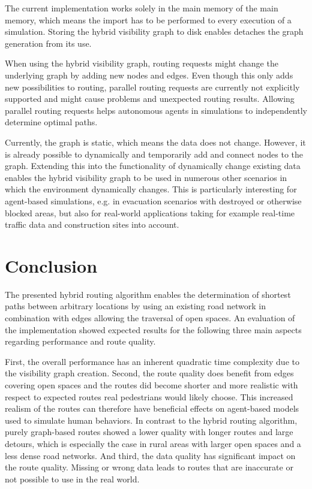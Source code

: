 		The current implementation works solely in the main memory of the main memory, which means the import has to be performed to every execution of a simulation.
		Storing the hybrid visibility graph to disk enables detaches the graph generation from its use.
		
		When using the hybrid visibility graph, routing requests might change the underlying graph by adding new nodes and edges.
		Even though this only adds new possibilities to routing, parallel routing requests are currently not explicitly supported and might cause problems and unexpected routing results.
		Allowing parallel routing requests helps autonomous agents in simulations to independently determine optimal paths.
		
		Currently, the graph is static, which means the data does not change.
		However, it is already possible to dynamically and temporarily add and connect nodes to the graph.
		Extending this into the functionality of dynamically change existing data enables the hybrid visibility graph to be used in numerous other scenarios in which the environment dynamically changes.
		This is particularly interesting for agent-based simulations, e.g. in evacuation scenarios with destroyed or otherwise blocked areas, but also for real-world applications taking for example real-time traffic data and construction sites into account.
		
\section{Conclusion}

	The presented hybrid routing algorithm enables the determination of shortest paths between arbitrary locations by using an existing road network in combination with edges allowing the traversal of open spaces.
	An evaluation of the implementation showed expected results for the following three main aspects regarding performance and route quality.
	
	First, the overall performance has an inherent quadratic time complexity due to the visibility graph creation.
	Second, the route quality does benefit from edges covering open spaces and the routes did become shorter and more realistic with respect to expected routes real pedestrians would likely choose.
	This increased realism of the routes can therefore have beneficial effects on agent-based models used to simulate human behaviors.
	In contrast to the hybrid routing algorithm, purely graph-based routes showed a lower quality with longer routes and large detours, which is especially the case in rural areas with larger open spaces and a less dense road networks.
	And third, the data quality has significant impact on the route quality.
	Missing or wrong data leads to routes that are inaccurate or not possible to use in the real world.
	
